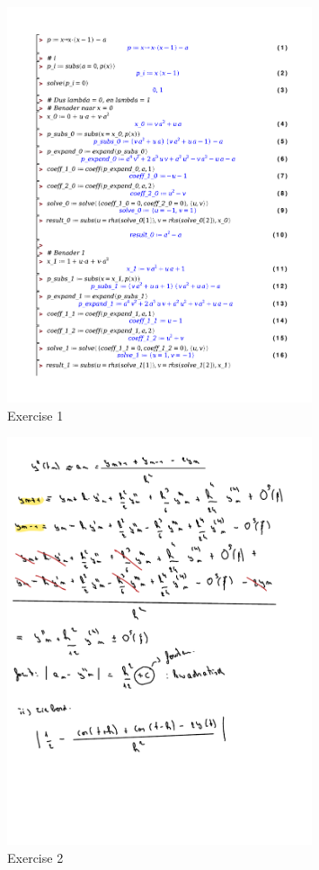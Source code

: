 \documentclass[a4paper]{report}
\begin{document}
\begin{figure}[H]
	\centering
	\includegraphics[width=0.8\textwidth]{./exercises/wc_1_ex_1.pdf}
	\caption{Exercise 1}
\end{figure}

\begin{figure}[H]
	\centering
	\includegraphics[width=0.8\textwidth]{./assets/wc_1_ex_2.pdf}
	\caption{Exercise 2}
\end{figure}
\end{document}
